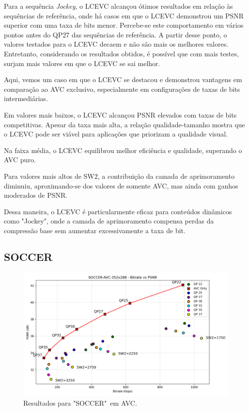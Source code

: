Para a sequência \textit{Jockey}, o \acrshort{LCEVC} alcançou ótimos resultados
em relação às sequências de referência, onde há casos em que o \acrshort{LCEVC}
demonstrou um \acrshort{PSNR} superior com uma taxa de bits menor. Percebe-se
este comportamento em vários pontos antes do QP27 das sequências de referência.
A partir desse ponto, o valores testados para o \acrshort{LCEVC} decaem e não
são mais os melhores valores. Entretanto, considerando os resultados obtidos,
é possível que com mais testes, surjam mais valores em que o \acrshort{LCEVC}
se sai melhor.

Aqui, vemos um caso em que o \acrshort{LCEVC} se destacou e demonstrou vantagens
em comparação ao \acrshort{AVC} exclusivo, especialmente em configurações de 
taxas de bits intermediárias.

Em valores mais baixos, o \acrshort{LCEVC} alcançou \acrshort{PSNR} elevados
com taxas de bits competitivas. Apesar da taxa mais alta,
a relação qualidade-tamanho mostra que o \acrshort{LCEVC} pode ser viável
para aplicações que priorizam a qualidade visual.

Na faixa média, o \acrshort{LCEVC} equilibrou melhor eficiência e qualidade,
superando o \acrshort{AVC} puro. 

Para valores mais altos de SW2, a contribuição da camada de aprimoramento
diminuiu, aproximando-se dos valores de somente \acrshort{AVC}, mas ainda
com ganhos moderados de \acrshort{PSNR}.

Dessa maneira, o \acrshort{LCEVC} é particularmente eficaz para conteúdos
dinâmicos como "Jockey", onde a camada de aprimoramento compensa perdas da
compressão base sem aumentar excessivamente a taxa de bit.

\subsection{SOCCER}

\begin{figure}[h]
    \centering
    \includegraphics[width=1.0\textwidth]{img/SOCCER-AVC.png}
    \caption{Resultados para "SOCCER"\ em \acrshort{AVC}. \cite{xiph}}
    \label{fig:SOCCER}
\end{figure}

